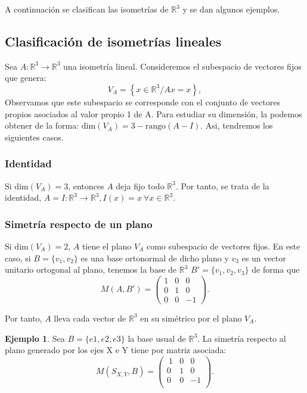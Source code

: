 \documentclass[11pt]{article}
\theoremstyle{definition}
\newtheorem{ejemplo}{Ejemplo}[section]
\begin{document}
    
	A continuación se clasifican las isometrías de $\mathbb R^3$ y se dan algunos ejemplos.
    
    \subsection{Clasificación de isometrías lineales}
Sea $A:\mathbb R^3\rightarrow\mathbb R^3$ una isometría lineal. Consideremos el subespacio de vectores fijos que genera:
\[V_A=\left\{x\in\mathbb R^3/Ax=x \right\},\]
Observamos que este subespacio se corresponde con el conjunto de vectores propios asociados al valor propio 1 de A. Para estudiar su dimensión, la podemos obtener de la forma: $\mathrm{dim}(V_A)=3-\text{rango}(A-I)$. Asi, tendremos los siguientes casos.

    \subsubsection{Identidad}
    Si $\mathrm{dim}(V_A)=3$, entonces $A$ deja fijo todo $\mathbb R^3$. Por tanto, se trata de la identidad,  $A=I:\mathbb R^3\rightarrow \mathbb R^3, I(x)=x\ \forall x\in \mathbb R^3$.
    
    \subsubsection{Simetría respecto de un plano}
  	Si $\mathrm{dim}(V_A)=2$, $A$ tiene el plano $V_A$ como subespacio de vectores fijos. En este caso, si $B=\{v_1, v_2\}$ es una base ortonormal de dicho plano y $v_3$ es un vector unitario ortogonal al plano, tenemos la base de $\mathbb{R}^3$ $B'=\{v_1,v_2,v_3\}$ de forma que
    \[M(A, B')=\begin{pmatrix}1&0&0\\0&1&0\\0&0&-1\end{pmatrix}.\]
    
    Por tanto, $A$ lleva cada vector de $\mathbb R^3$ en su simétrico por el plano $V_A$.
    
\begin{ejemplo}
Sea $B=\{e1 , e2 , e3\}$ la base usual de  $\mathbb{R}^3$. La simetría respecto al plano generado por los ejes X e Y tiene por matriz asociada:  
\[M(S_{X,Y},B)=
    \begin{pmatrix} 
    \ 1 & 0 & 0 \\ 0 & 1 & 0 \\ 0 & 0 & -1 \\ 
    \end{pmatrix}.
  \]
\end{ejemplo}
\end{document}
